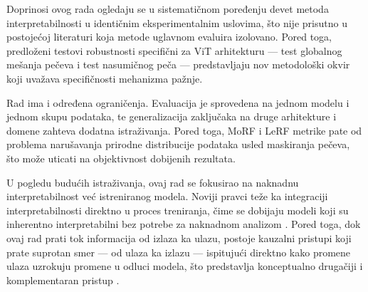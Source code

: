Doprinosi ovog rada ogledaju se u sistematičnom poređenju devet metoda interpretabilnosti u identičnim eksperimentalnim uslovima, što nije prisutno u postojećoj literaturi koja metode uglavnom evaluira izolovano. Pored toga, predloženi testovi robustnosti specifični za ViT arhitekturu — test globalnog mešanja pečeva i test nasumičnog peča — predstavljaju nov metodološki okvir koji uvažava specifičnosti mehanizma pažnje.

Rad ima i određena ograničenja. Evaluacija je sprovedena na jednom modelu i jednom skupu podataka, te generalizacija zaključaka na druge arhitekture i domene zahteva dodatna istraživanja. Pored toga, MoRF i LeRF metrike pate od problema narušavanja prirodne distribucije podataka usled maskiranja pečeva, što može uticati na objektivnost dobijenih rezultata.

U pogledu budućih istraživanja, ovaj rad se fokusirao na naknadnu interpretabilnost već istreniranog modela. Noviji pravci teže ka integraciji interpretabilnosti direktno u proces treniranja, čime se dobijaju modeli koji su inherentno interpretabilni bez potrebe za naknadnom analizom \cite{chen2019looks}. Pored toga, dok ovaj rad prati tok informacija od izlaza ka ulazu, postoje kauzalni pristupi koji prate suprotan smer — od ulaza ka izlazu — ispitujući direktno kako promene ulaza uzrokuju promene u odluci modela, što predstavlja konceptualno drugačiji i komplementaran pristup \cite{pearl2009causality}.